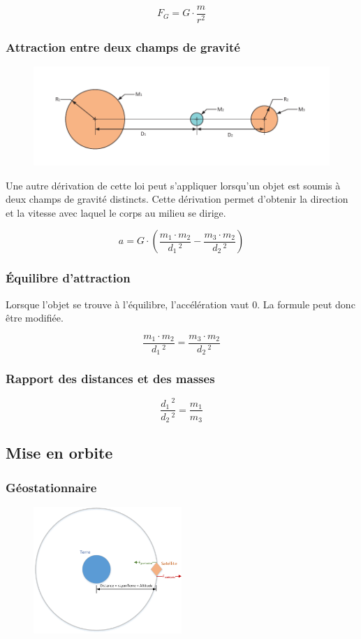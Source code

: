 \documentclass[12pt,a4paper]{article} %
\begin{document}
	$$F_G = G\cdot\frac{m}{r^2}$$

\subsubsection*{Attraction entre deux champs de gravité}
\begin{figure}[h]
	\centering
	\includegraphics{Newton-Gravitation-2Planetes}
\end{figure}
Une autre dérivation de cette loi peut s'appliquer lorsqu'un objet est soumis à deux champs de gravité distincts. Cette dérivation permet d'obtenir la direction et la vitesse avec laquel le corps au milieu se dirige.

	$$a = G \cdot \left(\frac{m_1 \cdot m_2}{d_1\,^2} - \frac{m_3 \cdot m_2}{d_2\,^2}\right)$$

\subsubsection*{Équilibre d'attraction}
Lorsque l'objet se trouve à l'équilibre, l'accélération vaut 0. La formule peut donc être modifiée.

	$$\frac{m_1 \cdot m_2}{d_1\,^2} = \frac{m_3 \cdot m_2}{d_2\,^2}$$

\subsubsection*{Rapport des distances et des masses}
	$$\frac{d_1\,^2}{d_2\, ^2} = \frac{m_1}{m_3}$$

\newpage

\subsection{Mise en orbite}

\subsubsection*{Géostationnaire}
\begin{figure}[h]
	\centering
	\includegraphics[width=0.5\textwidth]{Newton-OrbiteGeostationnaire}
\end{figure}
\end{document}
